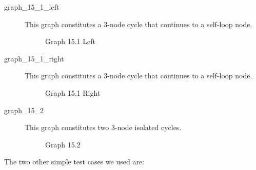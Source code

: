 \documentclass{article}
\begin{document}
\begin{description}
    \item[graph\_15\_1\_left] This graph constitutes a 3-node cycle that continues to a self-loop node.
    
    \begin{figure}[H]
        \centering
        \resizebox{0.5\textwidth}{!}{%
            
        }
        \caption{Graph 15.1 Left}
        \label{fig:graph_15_1_left}
    \end{figure}

    \item[graph\_15\_1\_right] This graph constitutes a 3-node cycle that continues to a self-loop node.
    
    \begin{figure}[H]
        \centering
        \resizebox{0.5\textwidth}{!}{%
            
        }
        \caption{Graph 15.1 Right}
        \label{fig:graph_15_1_right}
    \end{figure}

    \item[graph\_15\_2] This graph constitutes two 3-node isolated cycles.
    
    \begin{figure}[H]
        \centering
        \resizebox{0.5\textwidth}{!}{%
            
        }
        \caption{Graph 15.2}
        \label{fig:graph_15_2}
    \end{figure}
\end{description}

\noindent
The two other simple test cases we used are:
\end{document}
